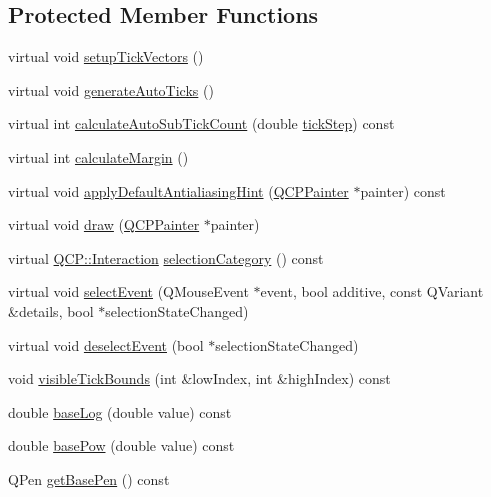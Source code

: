\subsection*{Protected Member Functions}
\begin{DoxyCompactItemize}
\item 
virtual void \hyperlink{classQCPAxis_a57d9e961bae7d62f5b4e1f143e660c78}{setup\+Tick\+Vectors} ()
\item 
virtual void \hyperlink{classQCPAxis_a626eef437c874148df1a5ac78506d463}{generate\+Auto\+Ticks} ()
\item 
virtual int \hyperlink{classQCPAxis_a3c5c045019fcdc0843a3e064eda7478a}{calculate\+Auto\+Sub\+Tick\+Count} (double \hyperlink{classQCPAxis_a0e6120d24266544441ab691f316a1b03}{tick\+Step}) const 
\item 
virtual int \hyperlink{classQCPAxis_a47bdb0a55de6759489ee47665199aebb}{calculate\+Margin} ()
\item 
virtual void \hyperlink{classQCPAxis_a13bde39eb1e0b7c14a02935689be8aba}{apply\+Default\+Antialiasing\+Hint} (\hyperlink{classQCPPainter}{Q\+C\+P\+Painter} $\ast$painter) const 
\item 
virtual void \hyperlink{classQCPAxis_a258b1e783eda5cd14ec5552c696a424e}{draw} (\hyperlink{classQCPPainter}{Q\+C\+P\+Painter} $\ast$painter)
\item 
virtual \hyperlink{namespaceQCP_a2ad6bb6281c7c2d593d4277b44c2b037}{Q\+C\+P\+::\+Interaction} \hyperlink{classQCPAxis_aca53b2f365dfc1257cba9e62395aa68f}{selection\+Category} () const 
\item 
virtual void \hyperlink{classQCPAxis_aa8a5fe80e2898ec08ada26b5fbee9eca}{select\+Event} (Q\+Mouse\+Event $\ast$event, bool additive, const Q\+Variant \&details, bool $\ast$selection\+State\+Changed)
\item 
virtual void \hyperlink{classQCPAxis_a53512242cde6ec21943a3ba10dbf78c3}{deselect\+Event} (bool $\ast$selection\+State\+Changed)
\item 
void \hyperlink{classQCPAxis_a06320a944d1120732cc0d72fe1306d8b}{visible\+Tick\+Bounds} (int \&low\+Index, int \&high\+Index) const 
\item 
double \hyperlink{classQCPAxis_a1385765db2419ee5fb5505a6cf9130fb}{base\+Log} (double value) const 
\item 
double \hyperlink{classQCPAxis_a97d69f021a05126fcb978d0aefea47b8}{base\+Pow} (double value) const 
\item 
Q\+Pen \hyperlink{classQCPAxis_a3eb0681d31baf579bb73b86a0153cb02}{get\+Base\+Pen} () const 

\end{DoxyCompactItemize}
